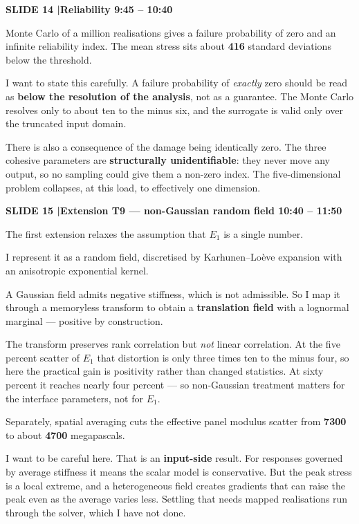 \documentclass[12pt,a4paper]{article}
\newcommand{\slide}[3]{%
  \bigskip
  \noindent\colorbox{luhblue}{\parbox{\dimexpr\linewidth-2\fboxsep}{%
    \color{white}\bfseries\small SLIDE #1 \quad|\quad #2 \hfill #3}}\par
  \nopagebreak\vspace{0.3em}}
\newcommand{\num}[1]{\textbf{#1}}
\begin{document}
\slide{14}{Reliability}{9:45 -- 10:40}

Monte Carlo of a million realisations gives a failure probability of zero and an infinite
reliability index. The mean stress sits about \num{416} standard deviations below the
threshold.

I want to state this carefully. A failure probability of \emph{exactly} zero should be read
as \textbf{below the resolution of the analysis}, not as a guarantee. The Monte Carlo
resolves only to about ten to the minus six, and the surrogate is valid only over the
truncated input domain.

There is also a consequence of the damage being identically zero. The three cohesive
parameters are \textbf{structurally unidentifiable}: they never move any output, so no
sampling could give them a non-zero index. The five-dimensional problem collapses, at this
load, to effectively one dimension.

\slide{15}{Extension T9 --- non-Gaussian random field}{10:40 -- 11:50}

The first extension relaxes the assumption that $E_1$ is a single number.

I represent it as a random field, discretised by Karhunen--Lo\`{e}ve expansion with an
anisotropic exponential kernel.

A Gaussian field admits negative stiffness, which is not admissible. So I map it through a
memoryless transform to obtain a \textbf{translation field} with a lognormal marginal ---
positive by construction.

The transform preserves rank correlation but \emph{not} linear correlation. At the five
percent scatter of $E_1$ that distortion is only three times ten to the minus four, so
here the practical gain is positivity rather than changed statistics. At sixty percent it
reaches nearly four percent --- so non-Gaussian treatment matters for the interface
parameters, not for $E_1$.

Separately, spatial averaging cuts the effective panel modulus scatter from
\num{7300} to about \num{4700} megapascals.

I want to be careful here. That is an \textbf{input-side} result. For responses governed
by average stiffness it means the scalar model is conservative. But the peak stress is a
local extreme, and a heterogeneous field creates gradients that can raise the peak even as
the average varies less. Settling that needs mapped realisations run through the solver,
which I have not done.
\end{document}
